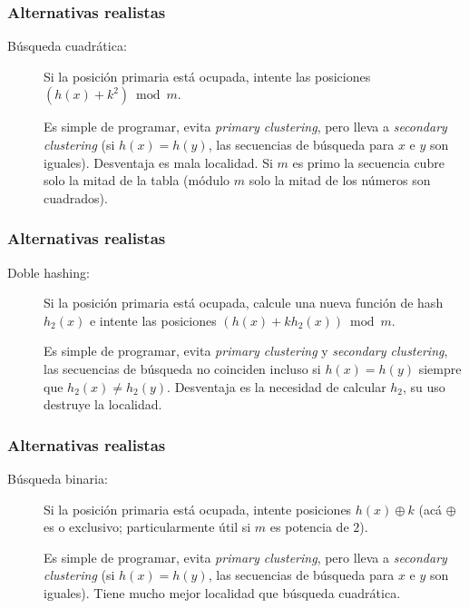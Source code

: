 \documentclass[english, spanish, fleqn,%
hyperref = {colorlinks, urlcolor = blue}%
]{beamer}
\begin{document}
\begin{frame}
  \setcounter{beamerpauses}{2}
  \frametitle{Alternativas realistas}

  \begin{description}
  \item[Búsqueda cuadrática:]
    Si la posición primaria está ocupada,
    intente las posiciones
    \((h(x) + k^2) \bmod m\).

    Es simple de programar,
    evita \emph{\foreignlanguage{english}{primary clustering}},
    pero lleva a \emph{\foreignlanguage{english}{secondary clustering}}
    (si \(h(x) = h(y)\),
     las secuencias de búsqueda para \(x\) e \(y\) son iguales).
    Desventaja es mala localidad.
    Si \(m\) es primo la secuencia cubre solo la mitad de la tabla
    (módulo \(m\) solo la mitad de los números son cuadrados).
  \end{description}
\end{frame}

\begin{frame}
  \setcounter{beamerpauses}{2}
  \frametitle{Alternativas realistas}

  \begin{description}
  \item[Doble hashing:]
    Si la posición primaria está ocupada,
    calcule una nueva función de hash \(h_2(x)\) e intente las posiciones
    \((h(x) + k h_2(x)) \bmod m\).

    Es simple de programar,
    evita \emph{\foreignlanguage{english}{primary clustering}}
    y \emph{\foreignlanguage{english}{secondary clustering}},
    las secuencias de búsqueda no coinciden incluso si \(h(x) = h(y)\)
    siempre que \(h_2(x) \ne h_2(y)\).
    Desventaja es la necesidad de calcular \(h_2\),
    su uso destruye la localidad.
  \end{description}
\end{frame}

\begin{frame}
  \setcounter{beamerpauses}{2}
  \frametitle{Alternativas realistas}

  \begin{description}
  \item[Búsqueda binaria:]
    Si la posición primaria está ocupada,
    intente posiciones \(h(x) \oplus k\)
    (acá \(\oplus\) es o exclusivo;
     particularmente útil si \(m\) es potencia de \(2\)).

    Es simple de programar,
    evita \emph{\foreignlanguage{english}{primary clustering}},
    pero lleva a \emph{\foreignlanguage{english}{secondary clustering}}
    (si \(h(x) = h(y)\),
     las secuencias de búsqueda para \(x\) e \(y\) son iguales).
    Tiene mucho mejor localidad que búsqueda cuadrática.
  \end{description}
\end{frame}
\end{document}
